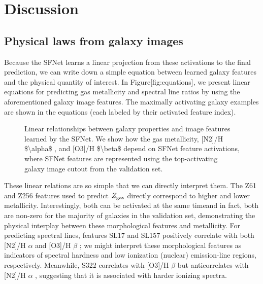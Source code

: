 \documentclass[11pt,a4paper]{article}
\begin{document}
\section{Discussion}

\subsection{Physical laws from galaxy images}

Because the SFNet learns a linear projection from these activations to the final prediction, we can write down a simple equation between learned galaxy features and the physical quantity of interest. In Figure[fig:equations], we present linear equations for predicting gas metallicity and spectral line ratios by using the aforementioned galaxy image features. The maximally activating galaxy examples are shown in the equations (each labeled by their activated feature index).

\begin{figure}[h]
\caption{Linear relationships between galaxy properties and image features learned by the SFNet. We show how the gas metallicity, [N2]/H \$\textbackslash{}alpha\$ , and [O3]/H \$\textbackslash{}beta\$  depend on SFNet feature activations, where SFNet features are represented using the top-activating galaxy image cutout from the validation set.}
\end{figure}

These linear relations are so simple that we can directly interpret them. The Z61 and Z256 features used to predict  $Z_{\rm gas}$  directly correspond to higher and lower metallicity. Interestingly, both can be activated at the same timeand in fact, both are non-zero for the majority of galaxies in the validation set, demonstrating the physical interplay between these morphological features and metallicity. For predicting spectral lines, features SL17 and SL157 positively correlate with both [N2]/H $\alpha$  and [O3]/H $\beta$ ; we might interpret these morphological features as indicators of spectral hardness and low ionization (nuclear) emission-line regions, respectively. Meanwhile, S322 correlates with [O3]/H $\beta$  but anticorrelates with [N2]/H $\alpha$ , suggesting that it is associated with harder ionizing spectra.
\end{document}
